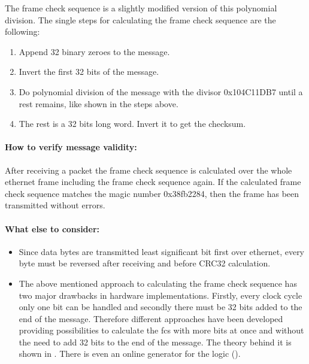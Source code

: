The frame check sequence is a slightly modified version of this polynomial division. The single steps for calculating the frame check sequence are the following:
\begin{enumerate}
  \item Append 32 binary zeroes to the message.
  \item Invert the first 32 bits of the message.
  \item Do polynomial division of the message with the divisor 0x104C11DB7 until a rest remains, like shown in the steps above.
  \item The rest is a 32 bits long word. Invert it to get the checksum.
\end{enumerate}

\paragraph{How to verify message validity:}
After receiving a packet the frame check sequence is calculated over the whole ethernet frame including the frame check sequence again. If the calculated frame check sequence matches the magic number 0x38fb2284, then the frame has been transmitted without errors.

\paragraph{What else to consider:}
\begin{itemize}
  \item Since data bytes are transmitted least significant bit first over ethernet, every byte must be reversed after receiving and before CRC32 calculation.
  \item The above mentioned approach to calculating the frame check sequence has two major drawbacks in hardware implementations. Firstly, every clock cycle only one bit can be handled and secondly there must be 32 bits added to the end of the message. Therefore different approaches have been developed providing possibilities to calculate the fcs with more bits at once and without the need to add 32 bits to the end of the message. The theory behind it is shown in \cite{parallel_crc}. There is even an online generator for the logic (\cite{parallel_crc_generator}).
\end{itemize}
